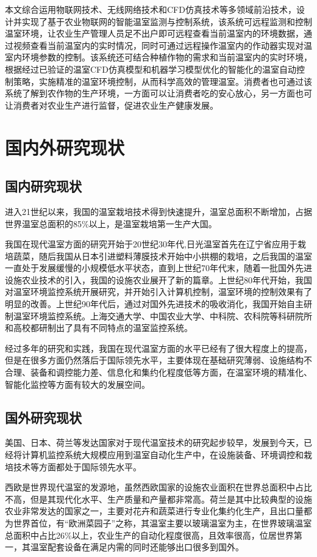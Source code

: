 本文综合运用物联网技术、无线网络技术和CFD仿真技术等多领域前沿技术，设计并实现了基于农业物联网的智能温室监测与控制系统，该系统可远程监测和控制温室环境，让农业生产管理人员足不出户即可远程查看当前温室内的环境数据，通过视频查看当前温室内的实时情况，同时可通过远程操作温室内的作动器实现对温室内环境参数的控制。该系统还可结合种植作物的需求和当前温室内的实时环境，根据经过已验证的温室CFD仿真模型和机器学习模型优化的智能化的温室自动控制策略，实施精准的温室环境控制，从而科学高效的管理温室。消费者也可通过该系统了解到农作物的生产环境，一方面可以让消费者吃的安心放心，另一方面也可让消费者对农业生产进行监督，促进农业生产健康发展。

\section{国内外研究现状}
	\subsection{国内研究现状}
	进入21世纪以来，我国的温室栽培技术得到快速提升，温室总面积不断增加，占据世界温室总面积的85\%以上，是温室栽培第一生产大国。
	
	我国在现代温室方面的研究开始于20世纪30年代,日光温室首先在辽宁省应用于栽培蔬菜，随后我国从日本引进塑料薄膜技术开始中小拱棚的栽培，之后我国的温室一直处于发展缓慢的小规模低水平状态，直到上世纪70年代末，随着一批国外先进设施农业技术的引入，我国的设施农业展开了新的篇章。上世纪80年代开始，我国对温室环境监控系统开展研究，并开始引入计算机控制，温室环境的控制效果有了明显的改善。上世纪90年代后，通过对国外先进技术的吸收消化，我国开始自主研制温室环境监控系统。上海交通大学、中国农业大学、中科院、农科院等科研院所和高校都研制出了具有不同特点的温室监控系统。

	经过多年的研究和实践，我国在现代温室方面的水平已经有了很大程度上的提高，但是在很多方面仍然落后于国际领先水平，主要体现在基础研究薄弱、设施结构不合理、装备和调控能力差、信息化和集约化程度低等方面，在温室环境的精准化、智能化监控等方面有较大的发展空间。

	\subsection{国外研究现状}
	美国、日本、荷兰等发达国家对于现代温室技术的研究起步较早，发展到今天，已经将计算机监控系统大规模应用到温室自动化生产中，在设施装备、环境调控和栽培技术等方面都处于国际领先水平。
	
西欧是世界现代温室的发源地，虽然西欧国家的设施农业面积在世界总面积中占比不高，但是其现代化水平、生产质量和产量都非常高。荷兰是其中比较典型的设施农业非常发达的国家之一，主要对花卉和蔬菜进行专业化集约化生产，且出口量都为世界首位，有“欧洲菜园子”之称，其温室主要以玻璃温室为主，在世界玻璃温室总面积中占比26\%以上，农业生产的自动化程度很高，且效率很高，位居世界第一，其温室配套设备在满足内需的同时还能够出口很多到国外。

